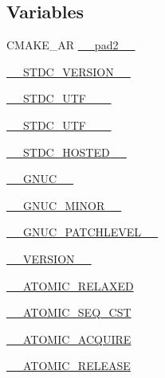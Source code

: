 \subsection*{Variables}
\begin{DoxyCompactItemize}
\item 
C\+M\+A\+K\+E\+\_\+\+AR \hyperlink{cmake-build-release_2CMakeCache_8txt_a69482a09c5986a2264f26d5ed1e4c90e}{\+\_\+\+\_\+pad2\+\_\+\+\_\+}
\item 
\hyperlink{cmake-build-release_2CMakeCache_8txt_aba69e7d86e970c5454fedf7e25cbf49e}{\+\_\+\+\_\+\+S\+T\+D\+C\+\_\+\+V\+E\+R\+S\+I\+O\+N\+\_\+\+\_\+}
\item 
\hyperlink{cmake-build-release_2CMakeCache_8txt_a391447bc12001cf307b9fec77d32c722}{\+\_\+\+\_\+\+S\+T\+D\+C\+\_\+\+U\+T\+F\+\_\+\_\+\+\_\+}
\item 
\hyperlink{cmake-build-release_2CMakeCache_8txt_aebc193933efcf54801ba103bf6d12dbb}{\+\_\+\+\_\+\+S\+T\+D\+C\+\_\+\+U\+T\+F\+\_\+\_\+\+\_\+}
\item 
\hyperlink{cmake-build-release_2CMakeCache_8txt_aacc78bc040f85bfc5d36eda8c048a1fe}{\+\_\+\+\_\+\+S\+T\+D\+C\+\_\+\+H\+O\+S\+T\+E\+D\+\_\+\+\_\+}
\item 
\hyperlink{cmake-build-release_2CMakeCache_8txt_a4f955bfc59f2aa5f37123f7fa8c45974}{\+\_\+\+\_\+\+G\+N\+U\+C\+\_\+\+\_\+}
\item 
\hyperlink{cmake-build-release_2CMakeCache_8txt_aefc5089d158028a655f8653d849ea643}{\+\_\+\+\_\+\+G\+N\+U\+C\+\_\+\+M\+I\+N\+O\+R\+\_\+\+\_\+}
\item 
\hyperlink{cmake-build-release_2CMakeCache_8txt_a68c7f08caefc9a019e0b82ec6b3fa343}{\+\_\+\+\_\+\+G\+N\+U\+C\+\_\+\+P\+A\+T\+C\+H\+L\+E\+V\+E\+L\+\_\+\+\_\+}
\item 
\hyperlink{cmake-build-release_2CMakeCache_8txt_abb4404c3387f41ca320babfbcff1102f}{\+\_\+\+\_\+\+V\+E\+R\+S\+I\+O\+N\+\_\+\+\_\+}
\item 
\hyperlink{cmake-build-release_2CMakeCache_8txt_acf476ec759fbe7a6aa89427ea8965872}{\+\_\+\+\_\+\+A\+T\+O\+M\+I\+C\+\_\+\+R\+E\+L\+A\+X\+ED}
\item 
\hyperlink{cmake-build-release_2CMakeCache_8txt_a44cd817264eb1136dae5f3b248f8fa8e}{\+\_\+\+\_\+\+A\+T\+O\+M\+I\+C\+\_\+\+S\+E\+Q\+\_\+\+C\+ST}
\item 
\hyperlink{cmake-build-release_2CMakeCache_8txt_a77baa125558a766167c49286c9873d7f}{\+\_\+\+\_\+\+A\+T\+O\+M\+I\+C\+\_\+\+A\+C\+Q\+U\+I\+RE}
\item 
\hyperlink{cmake-build-release_2CMakeCache_8txt_a5738074ef1a9257e5bcb0b527c2c93a3}{\+\_\+\+\_\+\+A\+T\+O\+M\+I\+C\+\_\+\+R\+E\+L\+E\+A\+SE}

\end{DoxyCompactItemize}
